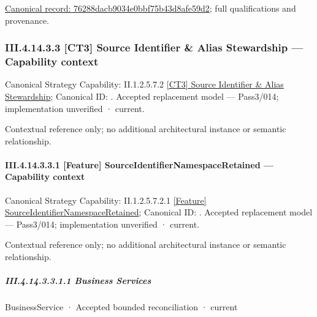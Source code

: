 {\footnotesize \href{../../../../continuum/business/business-function/76288dacb9034e0bbf75b43d8afe59d2.md}{Canonical record: 76288dacb9034e0bbf75b43d8afe59d2}; full qualifications and provenance.}\par
\subsubsection*{III.4.14.3.3 [CT3] Source Identifier \& Alias Stewardship — Capability context}
\label{navigation:III.4.14.3.3}

{\small Canonical Strategy Capability: II.1.2.5.7.2 \hyperref[element:d928bd4033a84a5e9fde8ec88e31bbd6]{[CT3] Source Identifier \& Alias Stewardship}; Canonical ID: \texttt{}. Accepted replacement model — Pass3/014; implementation unverified · current.}\par
Contextual reference only; no additional architectural instance or semantic relationship.\par
\paragraph*{III.4.14.3.3.1 [Feature] SourceIdentifierNamespaceRetained — Capability context}
\label{navigation:III.4.14.3.3.1}

{\small Canonical Strategy Capability: II.1.2.5.7.2.1 \hyperref[element:6c77e4aa99d6438c93a5df4720758414]{[Feature] SourceIdentifierNamespaceRetained}; Canonical ID: \texttt{}. Accepted replacement model — Pass3/014; implementation unverified · current.}\par
Contextual reference only; no additional architectural instance or semantic relationship.\par
\subparagraph*{III.4.14.3.3.1.1 Business Services}
\label{navigation:III.4.14.3.3.1.1}

\label{navigation:III.4.14.3.3.1.1.1}

\label{element:063b7a6b4ad549428a7566a4ce2c5de5}
{\small BusinessService · Accepted bounded reconciliation · current}\par

